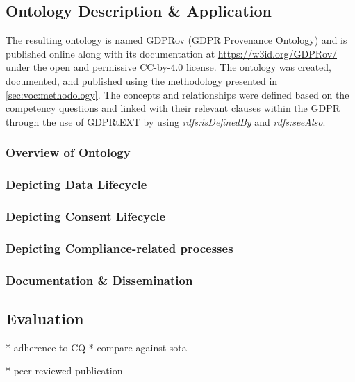 \subsection{Ontology Description \& Application}
The resulting ontology is named GDPRov (GDPR Provenance Ontology) and is published online along with its documentation at \url{https://w3id.org/GDPRov/} under the open and permissive CC-by-4.0 license.
The ontology was created, documented, and published using the methodology presented in \autoref{sec:voc:methodology}.
The concepts and relationships were defined based on the competency questions and linked with their relevant clauses within the GDPR through the use of GDPRtEXT by using \textit{rdfs:isDefinedBy} and \textit{rdfs:seeAlso}.

\subsubsection{Overview of Ontology}

\subsubsection{Depicting Data Lifecycle}

\subsubsection{Depicting Consent Lifecycle}

\subsubsection{Depicting Compliance-related processes}

\subsubsection{Documentation \& Dissemination}

\subsection{Evaluation}

* adherence to CQ
* compare against sota

* peer reviewed publication

